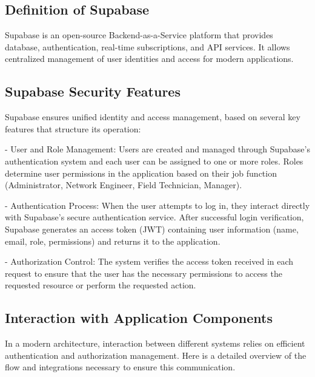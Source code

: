 \subsection{Definition of Supabase}
Supabase is an open-source Backend-as-a-Service platform that provides database, authentication, real-time subscriptions, and API services. It allows centralized management of user identities and access for modern applications.

\subsection{Supabase Security Features}
Supabase ensures unified identity and access management, based on several key features that structure its operation:
\vspace{0.5cm} 
\newline

- User and Role Management: 
\vspace{0.2cm}
\newline
Users are created and managed through Supabase's authentication system and each user can be assigned to one or more roles. Roles determine user permissions in the application based on their job function (Administrator, Network Engineer, Field Technician, Manager).
\vspace{0.5cm}
\newline

- Authentication Process:
\vspace{0.2cm}
\newline
When the user attempts to log in, they interact directly with Supabase's secure authentication service.
After successful login verification, Supabase generates an access token (JWT) containing user information (name, email, role, permissions) and returns it to the application.
\vspace{0.5cm} 
\newline

- Authorization Control: 
\vspace{0.2cm}
\newline
The system verifies the access token received in each request to ensure that the user has the necessary permissions to access the requested resource or perform the requested action.
\newline

\subsection{Interaction with Application Components}
In a modern architecture, interaction between different systems relies on efficient authentication and authorization management. Here is a detailed overview of the flow and integrations necessary to ensure this communication.
\vspace{0.5cm} 
\newline


